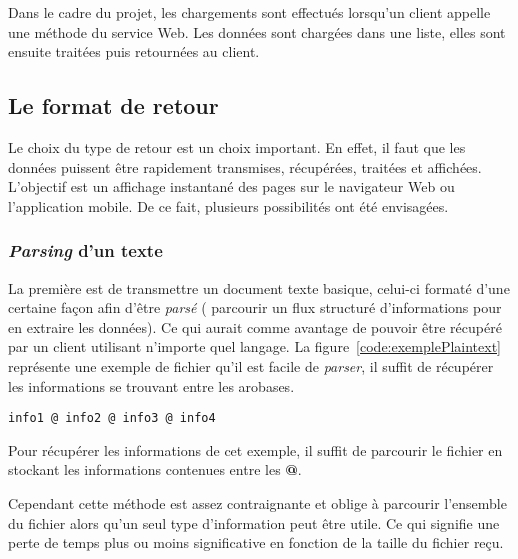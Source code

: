Dans le cadre du projet, les chargements sont effectu\'es lorsqu'un client appelle une m\'ethode du service Web. 
Les donn\'ees sont charg\'ees dans une liste, elles sont ensuite trait\'ees puis retourn\'ees au client.

\subsection{Le format de retour}
\label{section:formatRetour}

Le choix du type de retour est un choix important.
En effet, il faut que les donn\'ees puissent \^etre rapidement transmises, r\'ecup\'er\'ees, trait\'ees et affich\'ees.
L'objectif est un affichage instantan\'e des pages sur le navigateur Web ou l'application mobile.
De ce fait, plusieurs possibilit\'es ont \'et\'e envisag\'ees.


\subsubsection{{\og}\textit{Parsing}{\fg} d'un texte}

La premi\`ere est de transmettre un document texte basique, celui-ci format\'e d'une certaine fa\c{c}on afin d'\^etre \textit{pars\'e} ({\cad} parcourir un flux structur\'e d'informations pour en extraire les donn\'ees).
Ce qui aurait comme avantage de pouvoir \^etre r\'ecup\'er\'e par un client utilisant n'importe quel langage.
La figure~\ref{code:exemplePlaintext} repr\'esente une exemple de fichier qu'il est facile de \textit{parser}, il suffit de r\'ecup\'erer les informations se trouvant entre les arobases.

\vspace{0.20cm}

\begin{lstlisting}[language=plaintext]
info1 @ info2 @ info3 @ info4
\end{lstlisting}
\label{code:exemplePlaintext}

Pour r\'ecup\'erer les informations de cet exemple, il suffit de parcourir le fichier en stockant les informations contenues entre les \textbf{@}.

Cependant cette m\'ethode est assez contraignante et oblige \`a parcourir l'ensemble du fichier alors qu'un seul type d'information peut \^etre utile.
Ce qui signifie une perte de temps plus ou moins significative en fonction de la taille du fichier re\c{c}u.

